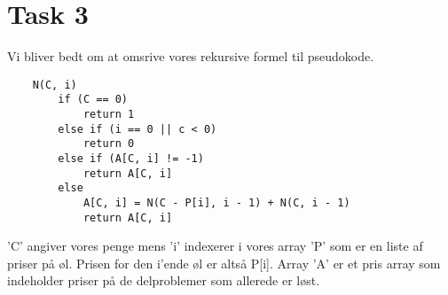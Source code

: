 \section{Task 3}
Vi bliver bedt om at omsrive vores rekursive formel til pseudokode.
\begin{lstlisting}
	N(C, i)
		if (C == 0)
			return 1
		else if (i == 0 || c < 0)
			return 0
		else if (A[C, i] != -1)
			return A[C, i]
		else
			A[C, i] = N(C - P[i], i - 1) + N(C, i - 1)
			return A[C, i]
\end{lstlisting}
'C' angiver vores penge mens 'i' indexerer i vores array 'P' som er en liste af priser på øl. Prisen for den i'ende øl er altså P[i]. Array 'A' er et pris array som indeholder priser på de delproblemer som allerede er løst.

